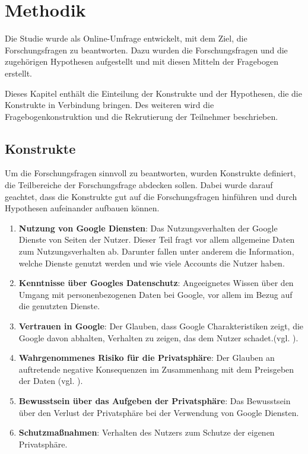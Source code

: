 %
% 

\chapter{Methodik}

Die Studie wurde als Online-Umfrage entwickelt, mit dem Ziel, die Forschungsfragen zu beantworten. Dazu wurden die Forschungsfragen und die zugehörigen Hypothesen aufgestellt und mit diesen Mitteln der Fragebogen erstellt. 

Dieses Kapitel enthält die Einteilung der Konstrukte und der Hypothesen, die die Konstrukte in Verbindung bringen. 
Des weiteren wird die Fragebogenkonstruktion und die Rekrutierung der Teilnehmer beschrieben.

\section{Konstrukte}
\label{sec:categories}
Um die Forschungsfragen sinnvoll zu beantworten, wurden Konstrukte definiert, die Teilbereiche der Forschungsfrage abdecken sollen. Dabei wurde darauf geachtet, dass die Konstrukte gut auf die Forschungsfragen hinführen und durch Hypothesen aufeinander aufbauen können.

\begin{enumerate}
\item \label{itm:Kat0}\textbf{Nutzung von Google Diensten}: Das Nutzungsverhalten der Google Dienste von Seiten der Nutzer. Dieser Teil fragt vor allem allgemeine Daten zum Nutzungsverhalten ab. Darunter fallen unter anderem die Information, welche Dienste genutzt werden und wie viele Accounts die Nutzer haben.
\item \label{itm:Kat1}\textbf{Kenntnisse über Googles Datenschutz}: Angeeignetes Wissen über den Umgang mit personenbezogenen Daten bei Google, vor allem im Bezug auf die genutzten Dienste.
\item \label{itm:Kat2}\textbf{Vertrauen in Google}: Der Glauben, dass Google Charakteristiken zeigt, die Google davon abhalten, Verhalten zu zeigen, das dem Nutzer schadet.(vgl. \citet{mcknight2002impact}).
\item \label{itm:Kat3}\textbf{Wahrgenommenes Risiko für die Privatsphäre}: Der Glauben an auftretende negative Konsequenzen im Zusammenhang mit dem Preisgeben der Daten (vgl. \citet{kim2008trust}).
\item \label{itm:Kat4}\textbf{Bewusstsein über das Aufgeben der Privatsphäre}: Das Bewusstsein über den Verlust der Privatsphäre bei der Verwendung von Google Diensten.
\item \label{itm:Kat5}\textbf{Schutzmaßnahmen}: Verhalten des Nutzers zum Schutze der eigenen Privatsphäre.
\end{enumerate}


